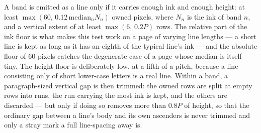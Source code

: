 A band is emitted as a line only if it carries enough ink and enough height: at least $\max(60,\,0.12\,\mathrm{median}_n N_n)$ owned pixels, where $N_n$ is the ink of band $n$, and a vertical extent of at least $\max(6,\,0.2P)$ rows.
The relative part of the ink floor is what makes this test work on a page of varying line lengths --- a short line is kept as long as it has an eighth of the typical line's ink --- and the absolute floor of 60 pixels catches the degenerate case of a page whose median is itself tiny.
The height floor is deliberately low, at a fifth of a pitch, because a line consisting only of short lower-case letters is a real line.
Within a band, a paragraph-sized vertical gap is then trimmed: the owned rows are split at empty rows into runs, the run carrying the most ink is kept, and the others are discarded --- but only if doing so removes more than $0.8P$ of height, so that the ordinary gap between a line's body and its own ascenders is never trimmed and only a stray mark a full line-spacing away is.

